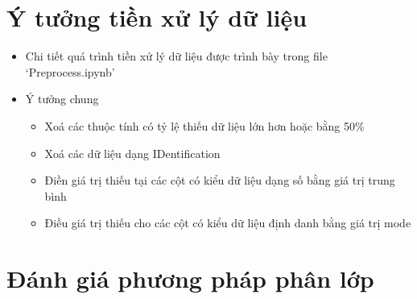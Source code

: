 \documentclass[a4paper, 12pt]{article}
\begin{document}
\section{Ý tưởng tiền xử lý dữ liệu}

\begin{itemize}
    \item Chi tiết quá trình tiền xử lý dữ liệu được trình bày trong file `Preprocess.ipynb'
    \item Ý tưởng chung
    \begin{itemize}
        \item Xoá các thuộc tính có tỷ lệ thiếu dữ liệu lớn hơn hoặc bằng 50\%
        \item Xoá các dữ liệu dạng IDentification
        \item Điền giá trị thiếu tại các cột có kiểu dữ liệu dạng số bằng giá trị trung bình 
        \item Điều giá trị thiếu cho các cột có kiểu dữ liệu định danh bằng giá trị mode
    \end{itemize}
\end{itemize}
\clearpage

\section{Đánh giá phương pháp phân lớp}
\end{document}
